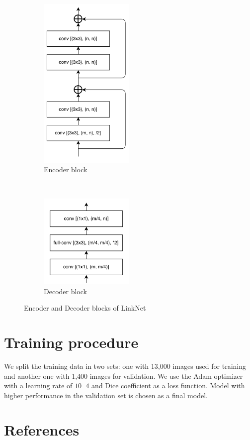 \documentclass[preprint]{elsarticle}
\theoremstyle{definition} %
\theoremstyle{remark}
\begin{document}
\begin{figure}[h!]
    \centering
	\begin{subfigure}[t]{0.25\textwidth}
		\centering
			\includegraphics[width=0.5\textwidth]{./figures/linknet_encoder_block.png}
		\caption{Encoder block}
	\end{subfigure}%
	~ 
	\begin{subfigure}[t]{0.25\textwidth}
		\centering
		\includegraphics[width=0.5\textwidth]{./figures/linknet_decoder_block.png}
		\caption{Decoder block}
	\end{subfigure}	
	\caption{Encoder and Decoder blocks of LinkNet \cite{DBLP:journals/corr/ChaurasiaC17}}
	\label{fig:linknet_enc_dec}
\end{figure}

\section{Training procedure}
We split the training data in two sets: one with 13,000 images used for training and another one with 1,400 images for validation. We use the Adam optimizer with a learning rate of $10^-4$ and Dice coefficient as a loss function. Model with higher performance in the validation set is chosen as a final model.

\section*{References}


\end{document}

